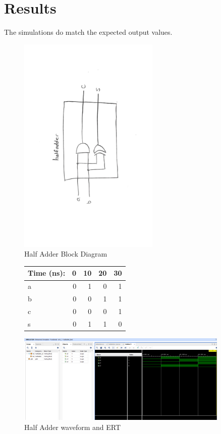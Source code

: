 \documentclass[11pt]{article}
\newcommand{\Verilog}[2][]{%
	
}
\begin{document}
\Verilog[caption = 2bit test]{/Users/Celaine_Hornsby1/Documents/GitHub/Lab05/Lab05/Lab05.srcs/sim_3/new/as_test.sv}

\section*{Results}
The simulations do match the expected output values. 

\begin{figure}[ht]\centering
	\includegraphics[width=0.6\textwidth]{HA_block}
	\caption{Half Adder Block Diagram}
	\label{fig:ha_block}
\end{figure}

\medskip

\begin{figure}[ht]\centering
	\begin{tabular}{l|rrrr}
		Time (ns): & 0 & 10 & 20 & 30 \\
		\midrule
		a & 0 & 1 & 0 & 1 \\
		b & 0 & 0 & 1 & 1 \\
		\midrule
		c & 0 & 0 & 0 & 1 \\
		s & 0 & 1 & 1 & 0 \\
		\bottomrule
	\end{tabular}\medskip
	
	\includegraphics[width=0.9\textwidth,trim = 8.5cm 11.75cm 0cm 2.5cm,clip]{HA_snip}
	\caption{Half Adder waveform and ERT}
	\label{fig:ha_ert}
\end{figure}
\end{document}
